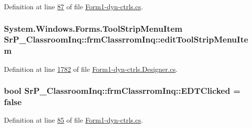 \-Definition at line \hyperlink{_form1-dyn-ctrls_8cs_source_l00087}{87} of file \hyperlink{_form1-dyn-ctrls_8cs_source}{\-Form1-\/dyn-\/ctrls.\-cs}.

\hypertarget{class_sr_p___classroom_inq_1_1frm_classrrom_inq_a3e1d074025f88cab6f1911c123de6abb}{
\subsubsection[{edit\-Tool\-Strip\-Menu\-Item}]{\setlength{\rightskip}{0pt plus 5cm}\-System.\-Windows.\-Forms.\-Tool\-Strip\-Menu\-Item {\bf \-Sr\-P\-\_\-\-Classroom\-Inq\-::frm\-Classrrom\-Inq\-::edit\-Tool\-Strip\-Menu\-Item}}}
\label{class_sr_p___classroom_inq_1_1frm_classrrom_inq_a3e1d074025f88cab6f1911c123de6abb}


\-Definition at line \hyperlink{_form1-dyn-ctrls_8_designer_8cs_source_l01782}{1782} of file \hyperlink{_form1-dyn-ctrls_8_designer_8cs_source}{\-Form1-\/dyn-\/ctrls.\-Designer.\-cs}.

\hypertarget{class_sr_p___classroom_inq_1_1frm_classrrom_inq_a2f126b875f216c20427f6818976a9465}{
\subsubsection[{\-E\-D\-T\-Clicked}]{\setlength{\rightskip}{0pt plus 5cm}bool {\bf \-Sr\-P\-\_\-\-Classroom\-Inq\-::frm\-Classrrom\-Inq\-::\-E\-D\-T\-Clicked} = false}}
\label{class_sr_p___classroom_inq_1_1frm_classrrom_inq_a2f126b875f216c20427f6818976a9465}


\-Definition at line \hyperlink{_form1-dyn-ctrls_8cs_source_l00085}{85} of file \hyperlink{_form1-dyn-ctrls_8cs_source}{\-Form1-\/dyn-\/ctrls.\-cs}.

